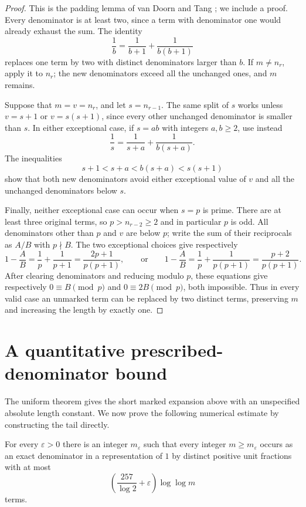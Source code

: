 \begin{proof}
This is the padding lemma of van Doorn and Tang
\cite[Lemma~2.1]{vanDoornTang2026}; we include a proof.
Every denominator is at least two, since a term with denominator one
would already exhaust the sum. The identity
\[
 \frac1b=\frac1{b+1}+\frac1{b(b+1)}
\]
replaces one term by two with distinct denominators larger than $b$.
If $m\ne n_r$, apply it to $n_r$; the new denominators exceed all
the unchanged ones, and $m$ remains.

Suppose that $m=v=n_r$, and let $s=n_{r-1}$.
The same split of $s$ works unless $v=s+1$ or $v=s(s+1)$,
since every other unchanged denominator is smaller than $s$.
In either exceptional case, if $s=ab$ with integers $a,b\ge2$, use instead
\[
 \frac1s=\frac1{s+a}+\frac1{b(s+a)}.
\]
The inequalities
\[
 s+1<s+a<b(s+a)<s(s+1)
\]
show that both new denominators avoid either exceptional value of
$v$ and all the unchanged denominators below $s$.

Finally, neither exceptional case can occur when $s=p$ is prime.
There are at least three original terms, so $p>n_{r-2}\ge2$ and
in particular $p$ is odd. All denominators other than $p$ and $v$
are below $p$; write the sum of their reciprocals as $A/B$ with
$p\nmid B$. The two exceptional choices give respectively
\[
 1-\frac AB
 =\frac1p+\frac1{p+1}
 =\frac{2p+1}{p(p+1)},
 \qquad\text{or}\qquad
 1-\frac AB
 =\frac1p+\frac1{p(p+1)}
 =\frac{p+2}{p(p+1)}.
\]
After clearing denominators and reducing modulo $p$, these equations
give respectively $0\equiv B\pmod p$ and $0\equiv2B\pmod p$,
both impossible. Thus in every valid case an unmarked term can be
replaced by two distinct terms, preserving $m$ and increasing the
length by exactly one.
\end{proof}

\section{A quantitative prescribed-denominator bound}
\label{sec:prescribed-quantitative}

The uniform theorem gives the short marked expansion above with an
unspecified absolute length constant. We now prove the following
numerical estimate by constructing the tail directly.

\begin{proposition}\label{prop:marked-length}
For every $\varepsilon>0$ there is an integer $m_\varepsilon$ such
that every integer $m\ge m_\varepsilon$ occurs as an exact denominator
in a representation of $1$ by distinct positive unit fractions with
at most
\[
 \left(\frac{257}{\log 2}+\varepsilon\right)\log\log m
\]
terms.
\end{proposition}

